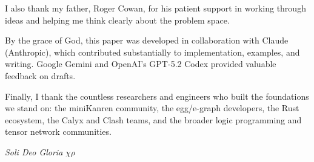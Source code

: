 \documentclass[11pt,a4paper]{article}
\begin{document}
I also thank my father, Roger Cowan, for his patient support in working through ideas and helping me think clearly about the problem space.

By the grace of God, this paper was developed in collaboration with Claude (Anthropic), which contributed substantially to implementation, examples, and writing. Google Gemini and OpenAI's GPT-5.2 Codex provided valuable feedback on drafts.

Finally, I thank the countless researchers and engineers who built the foundations we stand on: the miniKanren community, the egg/e-graph developers, the Rust ecosystem, the Calyx and Clash teams, and the broader logic programming and tensor network communities.





\vspace{1em}
\begin{center}
\textit{Soli Deo Gloria} \texorpdfstring{$\chi\rho$}{XP}
\end{center}
\end{document}
